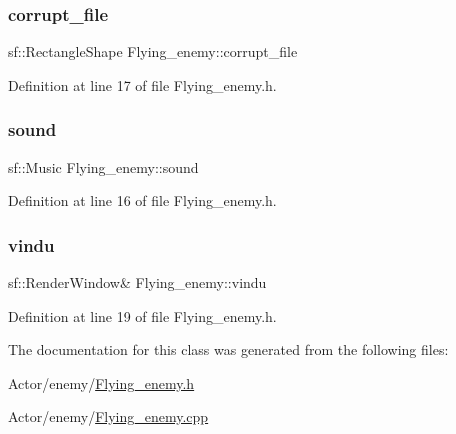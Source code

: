 \subsubsection{\texorpdfstring{corrupt\+\_\+file}{corrupt\_file}}
{\footnotesize\ttfamily sf\+::\+Rectangle\+Shape Flying\+\_\+enemy\+::corrupt\+\_\+file}



Definition at line 17 of file Flying\+\_\+enemy.\+h.

\hypertarget{class_flying__enemy_a4b51b8962f740ad0357420758e19d9c9}{}\label{class_flying__enemy_a4b51b8962f740ad0357420758e19d9c9} 
\subsubsection{\texorpdfstring{sound}{sound}}
{\footnotesize\ttfamily sf\+::\+Music Flying\+\_\+enemy\+::sound}



Definition at line 16 of file Flying\+\_\+enemy.\+h.

\hypertarget{class_flying__enemy_a27b52e8aef1f1164bf61e8ef0d16428c}{}\label{class_flying__enemy_a27b52e8aef1f1164bf61e8ef0d16428c} 
\subsubsection{\texorpdfstring{vindu}{vindu}}
{\footnotesize\ttfamily sf\+::\+Render\+Window\& Flying\+\_\+enemy\+::vindu}



Definition at line 19 of file Flying\+\_\+enemy.\+h.



The documentation for this class was generated from the following files\+:\begin{DoxyCompactItemize}
\item 
Actor/enemy/\hyperlink{_flying__enemy_8h}{Flying\+\_\+enemy.\+h}\item 
Actor/enemy/\hyperlink{_flying__enemy_8cpp}{Flying\+\_\+enemy.\+cpp}\end{DoxyCompactItemize}
